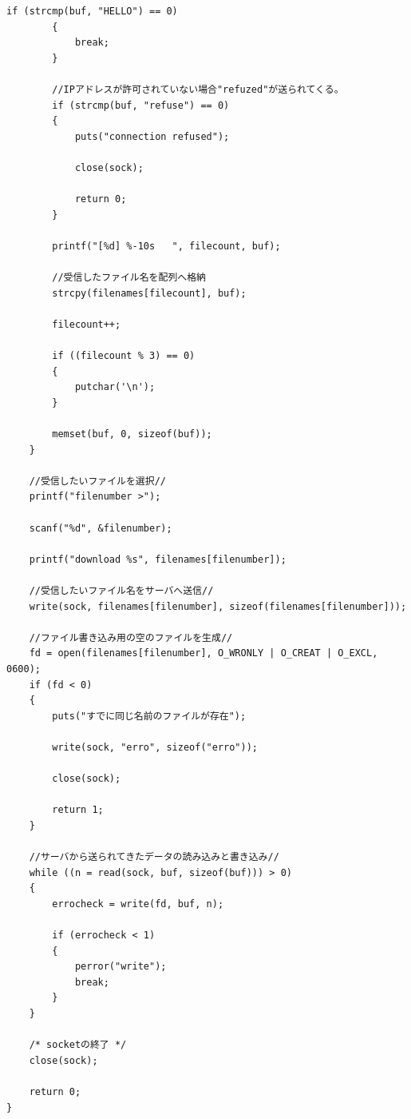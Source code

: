 \documentclass[dvipdfmx,autodetect-engine,titlepage]{jsarticle}
\begin{document}
\begin{lstlisting}[caption=client,label=client.c]
        if (strcmp(buf, "HELLO") == 0)
        {
            break;
        }

        //IPアドレスが許可されていない場合"refuzed"が送られてくる。
        if (strcmp(buf, "refuse") == 0)
        {
            puts("connection refused");

            close(sock);

            return 0;
        }

        printf("[%d] %-10s   ", filecount, buf);

        //受信したファイル名を配列へ格納
        strcpy(filenames[filecount], buf);

        filecount++;

        if ((filecount % 3) == 0)
        {
            putchar('\n');
        }

        memset(buf, 0, sizeof(buf));
    }

    //受信したいファイルを選択//
    printf("filenumber >");

    scanf("%d", &filenumber);

    printf("download %s", filenames[filenumber]);

    //受信したいファイル名をサーバへ送信//
    write(sock, filenames[filenumber], sizeof(filenames[filenumber]));

    //ファイル書き込み用の空のファイルを生成//
    fd = open(filenames[filenumber], O_WRONLY | O_CREAT | O_EXCL, 0600);
    if (fd < 0)
    {
        puts("すでに同じ名前のファイルが存在");

        write(sock, "erro", sizeof("erro"));

        close(sock);

        return 1;
    }

    //サーバから送られてきたデータの読み込みと書き込み//
    while ((n = read(sock, buf, sizeof(buf))) > 0)
    {
        errocheck = write(fd, buf, n);

        if (errocheck < 1)
        {
            perror("write");
            break;
        }
    }

    /* socketの終了 */
    close(sock);

    return 0;
}


\end{lstlisting}
\end{document}
